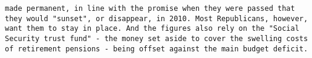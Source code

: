 \documentclass[11pt]{article}
\begin{document}
\begin{Verbatim}[commandchars=\\\{\}]
made permanent, in line with the promise when they were passed that they would "sunset", or disappear, in 2010. Most Republicans, however, want them to stay in place. And the figures also rely on the "Social Security trust fund" - the money set aside to cover the swelling costs of retirement pensions - being offset against the main budget deficit.                                                                                                                                                                                                                                                                                                                                                                                                                                                                                                                                                                                                                                                                                                                                                                                                                                                                                                                                                                                                                                                                                                                                                                                                                                                                                                                                                                                                                                                                                                                                                

\end{Verbatim}
\end{document}
